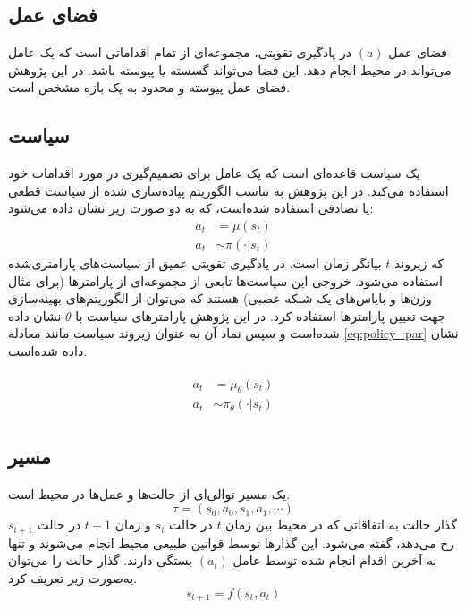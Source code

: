 \subsection{فضای عمل}
فضای عمل \((a)\) در یادگیری تقویتی، مجموعه‌ای از تمام اقداماتی است که یک عامل می‌تواند در محیط انجام دهد. این فضا می‌تواند گسسته یا پیوسته باشد. در این پژوهش فضای عمل پیوسته و محدود به یک بازه مشخص است.
\subsection{سیاست}
یک سیاست
  قاعده‌ای است که یک عامل برای تصمیم‌گیری در مورد اقدامات خود استفاده می‌کند. در این پژوهش به تناسب الگوریتم پیاده‌سازی شده از سیاست قطعی
 یا تصادفی
  استفاده شده‌است، که به دو صورت زیر  نشان داده می‌شود:
  \begin{align}
  	a_t &= \mu(s_t)\\
  	a_t & \sim \pi(\cdot | s_t)
  \end{align}
  که زیروند \(t\)
   بیانگر زمان است.
  در یادگیری تقویتی عمیق از سیاست‌های پارامتری‌شده استفاده می‌شود. خروجی‌ این سیاست‌ها تابعی از مجموعه‌ای از پارامترها (برای مثال وزن‌ها و بایاس‌های یک شبکه عصبی) هستند که می‌توان از الگوریتم‌های بهینه‌سازی جهت تعیین پارامترها استفاده کرد.
  در این پژوهش پارامترهای سیاست با \( \theta\) نشان داده شده‌است و سپس نماد آن به عنوان زیروند  سیاست مانند معادله \eqref{eq:policy_par} نشان داده شده‌است.
  
\begin{align}
	 \begin{split} 	 
 	a_t &= \mu_{\theta}(s_t) \\
 		a_t & \sim \pi_{\theta}(\cdot | s_t)
 	 \end{split}
 	 	\label{eq:policy_par}
\end{align}
\subsection{مسیر}
یک مسیر
 توالی‌ای از حالت‌ها و عمل‌ها در محیط است.
 \begin{equation}
		 \tau = (s_0, a_0, s_1, a_1, \cdots)
 \end{equation}
  گذار حالت
   به اتفاقاتی که در محیط بین 
   زمان \(t\)
   در حالت \(s_t\)
   و
      زمان
       \(t+1\)
   در حالت
    \(s_{t+1}\)
   رخ می‌دهد، گفته می‌شود. این گذارها توسط قوانین طبیعی محیط انجام می‌شوند و تنها به آخرین اقدام انجام شده توسط عامل \((a_t)\) بستگی دارند. گذار حالت را می‌توان به‌صورت زیر تعریف کرد.
   \begin{equation}
   	s_{t+1} = f(s_t, a_t)
   \end{equation}
  
